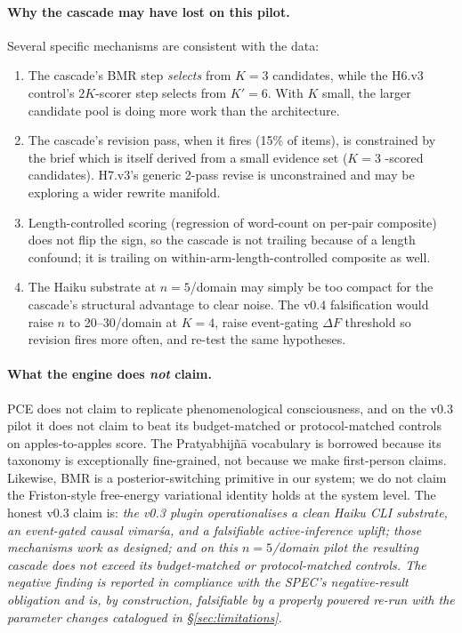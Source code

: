 \paragraph{Why the cascade may have lost on this pilot.} Several specific mechanisms are consistent with the data:
\begin{enumerate}[leftmargin=1.4em]
  \item The cascade's  BMR step \emph{selects} from $K{=}3$ candidates, while the H6.v3 control's $2K$-scorer step selects from $K'{=}6$. With $K$ small, the larger candidate pool is doing more work than the architecture.
  \item The cascade's revision pass, when it fires (15\% of items), is constrained by the  brief which is itself derived from a small evidence set ($K{=}3$ -scored candidates). H7.v3's generic 2-pass revise is unconstrained and may be exploring a wider rewrite manifold.
  \item Length-controlled scoring (regression of word-count on per-pair composite) does not flip the sign, so the cascade is not trailing because of a length confound; it is trailing on within-arm-length-controlled composite as well.
  \item The Haiku substrate at $n{=}5$/domain may simply be too compact for the cascade's structural advantage to clear noise. The v0.4 falsification would raise $n$ to 20--30/domain at $K{=}4$, raise event-gating $\Delta F$ threshold so revision fires more often, and re-test the same hypotheses.
\end{enumerate}

\paragraph{What the engine does \emph{not} claim.} PCE does not claim to replicate phenomenological consciousness, and on the v0.3 pilot it does not claim to beat its budget-matched or protocol-matched controls on apples-to-apples score. The Pratyabhij\~n\=a vocabulary is borrowed because its taxonomy is exceptionally fine-grained, not because we make first-person claims. Likewise, BMR is a posterior-switching primitive in our system; we do not claim the Friston-style free-energy variational identity holds at the system level. The honest v0.3 claim is: \emph{the v0.3 plugin operationalises a clean Haiku CLI substrate, an event-gated causal vimar\'sa, and a falsifiable active-inference uplift; those mechanisms work as designed; and on this $n{=}5$/domain pilot the resulting cascade does not exceed its budget-matched or protocol-matched controls. The negative finding is reported in compliance with the SPEC's negative-result obligation and is, by construction, falsifiable by a properly powered re-run with the parameter changes catalogued in \S\ref{sec:limitations}.}
